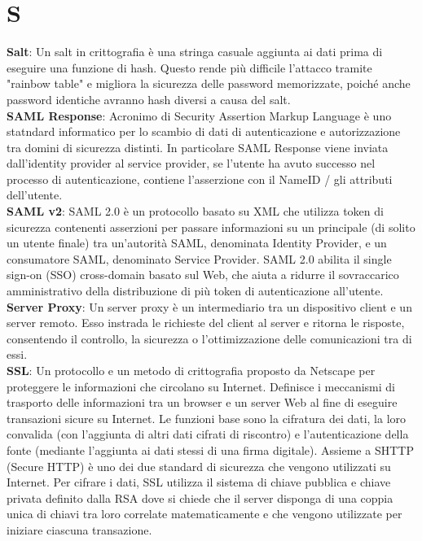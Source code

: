 \section{S}
\textbf{Salt}: Un salt in crittografia è una stringa casuale aggiunta ai dati prima di eseguire una funzione di hash. Questo rende più difficile l'attacco tramite "rainbow table" e migliora la sicurezza delle password memorizzate, poiché anche password identiche avranno hash diversi a causa del salt.\\
\textbf{SAML Response}: Acronimo di Security Assertion Markup Language è uno statndard informatico per lo scambio di dati di autenticazione e autorizzazione tra domini di sicurezza distinti. In particolare SAML Response viene inviata dall'identity provider al service provider, se l'utente ha avuto successo nel processo di autenticazione, contiene l'asserzione con il NameID / gli attributi dell'utente.\\
\textbf{SAML v2}: SAML 2.0 è un protocollo basato su XML che utilizza token di sicurezza contenenti asserzioni per passare informazioni su un principale (di solito un utente finale) tra un'autorità SAML, denominata Identity Provider, e un consumatore SAML, denominato Service Provider. SAML 2.0 abilita il single sign-on (SSO) cross-domain basato sul Web, che aiuta a ridurre il sovraccarico amministrativo della distribuzione di più token di autenticazione all'utente.\\
\textbf{Server Proxy}: Un server proxy è un intermediario tra un dispositivo client e un server remoto. Esso instrada le richieste del client al server e ritorna le risposte, consentendo il controllo, la sicurezza o l'ottimizzazione delle comunicazioni tra di essi.\\
\textbf{SSL}: Un protocollo e un metodo di crittografia proposto da Netscape per proteggere le informazioni che circolano su Internet. 
Definisce i meccanismi di trasporto delle informazioni tra un browser e un server Web al fine di eseguire transazioni sicure su Internet. 
Le funzioni base sono la cifratura dei dati, la loro convalida (con l'aggiunta di altri dati cifrati di riscontro) e l'autenticazione della 
fonte (mediante l'aggiunta ai dati stessi di una firma digitale). Assieme a SHTTP (Secure HTTP) è uno dei due standard di sicurezza che vengono 
utilizzati su Internet. Per cifrare i dati, SSL utilizza il sistema di chiave pubblica e chiave privata definito dalla RSA dove si chiede che il server 
disponga di una coppia unica di chiavi tra loro correlate matematicamente e che vengono utilizzate per iniziare ciascuna transazione. 
